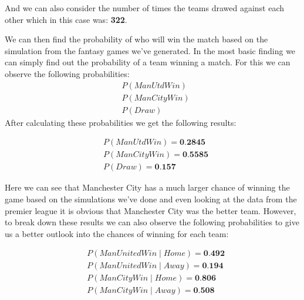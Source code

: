 \documentclass[12pt]{report}
\begin{document}
\vspace{0.3cm}
\noindent
And we can also consider the number of times the teams drawed against each other which in this case was: \textbf{322}.

\vspace{0.3cm}

We can then find the probability of who will win the match based on the simulation from the fantasy games we've generated. In the most basic finding we can simply find out the probability of a team winning a match. For this we can observe the following probabilities:
\begin{equation*}
	\begin{aligned}
    	& P(ManUtdWin) \\ 
    	& P(ManCityWin) \\
    	& P(Draw)
	\end{aligned}
\end{equation*}
\noindent
After calculating these probabilities we get the following results:

\vspace{0.3cm}
\noindent
\begin{equation*}
	\begin{aligned}
    	& P(ManUtdWin) = \textbf{0.2845} \\ 
    	& P(ManCityWin) = \textbf{0.5585} \\
    	& P(Draw) = \textbf{0.157}
	\end{aligned}
\end{equation*}

\vspace{0.3cm}
\noindent
Here we can see that Manchester City has a much larger chance of winning the game based on the simulations we've done and even looking at the data from the premier league it is obvious that Manchester City was the better team. However, to break down these results we can also observe the following probabilities to give us a better outlook into the chances of winning for each team:

\vspace{0.3cm}
\noindent
\begin{equation*}
	\begin{aligned}
    	& P(ManUnitedWin \mid Home) = \textbf{0.492}\\ 
    	& P(ManUnitedWin \mid Away) = \textbf{0.194}\\
    	& P(ManCityWin \mid Home) = \textbf{0.806}\\
    	& P(ManCityWin \mid Away) = \textbf{0.508}	
	\end{aligned}
\end{equation*}
\end{document}

